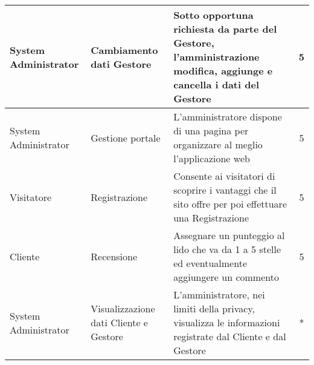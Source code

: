 \begin{tabularx}{\textwidth}{|X|X|X|c|}
System \newline Administrator & Cambiamento \newline dati Gestore & Sotto opportuna richiesta da parte del Gestore, l'amministrazione modifica, aggiunge e cancella i dati del Gestore & 5\\
\hline
System \newline Administrator & Gestione \newline portale & L'amministratore dispone di una pagina per organizzare al meglio l'applicazione web & 5\\
\hline
 Visitatore & Registrazione & Consente ai visitatori di scoprire i vantaggi che il sito offre per poi effettuare una
 Registrazione & 5\\
\hline
Cliente & Recensione & Assegnare un punteggio al lido che va da 1 a 5 stelle ed eventualmente aggiungere un commento & 5\\
\hline
System \newline Administrator & Visualizzazione \newline dati Cliente \newline e Gestore & L'amministratore, nei limiti della privacy, visualizza le informazioni registrate dal Cliente e dal Gestore & *\\
\hline  

\end{tabularx}
